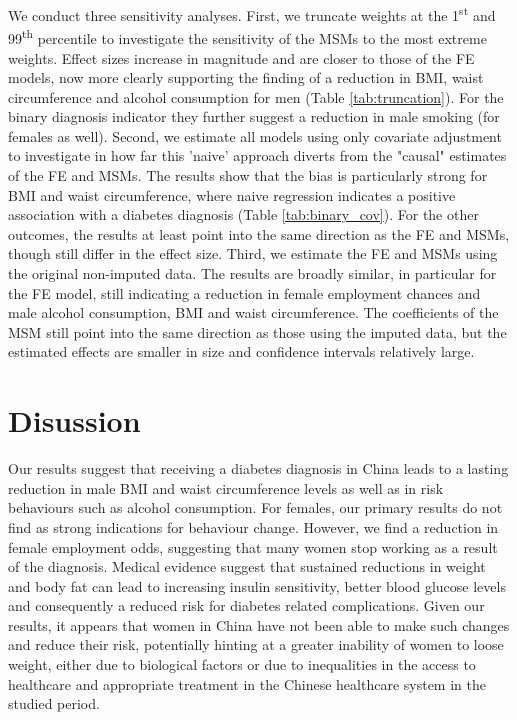 We conduct three sensitivity analyses. First, we truncate weights at the 1\textsuperscript{st} and 99\textsuperscript{th} percentile to investigate the sensitivity of the \acp{MSM} to the most extreme weights. Effect sizes increase in magnitude and are closer to those of the \ac{FE} models, now more clearly supporting the finding of a reduction in \ac{BMI}, waist circumference and alcohol consumption for men (Table \ref{tab:truncation}). For the binary diagnosis indicator they further suggest a reduction in male smoking (for females as well). Second, we estimate all models using only covariate adjustment to investigate in how far this 'naive' approach diverts from the "causal" estimates of the \ac{FE} and \acp{MSM}. The results show that the bias is particularly strong for \ac{BMI} and waist circumference, where naive regression indicates a positive association with a diabetes diagnosis (Table \ref{tab:binary_cov}). For the other outcomes, the results at least point into the same direction as the \ac{FE} and \acp{MSM}, though still differ in the effect size. Third, we estimate the \ac{FE} and \acp{MSM} using the original non-imputed data. The results are broadly similar, in particular for the \ac{FE} model, still indicating a reduction in female employment chances and male alcohol consumption, \ac{BMI} and waist circumference. The coefficients of the \ac{MSM} still point into the same direction as those using the imputed data, but the estimated effects are smaller in size and confidence intervals relatively large.


\FloatBarrier


\section{Disussion}

Our results suggest that receiving a diabetes diagnosis in China leads to a lasting reduction in male \ac{BMI} and waist circumference levels as well as in risk behaviours such as alcohol consumption. For females, our primary results do not find as strong indications for behaviour change. However, we find a reduction in female employment odds, suggesting that many women stop working as a result of the diagnosis.
Medical evidence suggest that sustained reductions in weight and body fat can lead to increasing insulin sensitivity, better blood glucose levels and consequently a reduced risk for diabetes related complications. Given our results, it appears that women in China have not been able to make such changes and reduce their risk, potentially hinting at a greater inability of women to loose weight, either due to biological factors or due to inequalities in the access to healthcare and appropriate treatment in the Chinese healthcare system in the studied period. 

